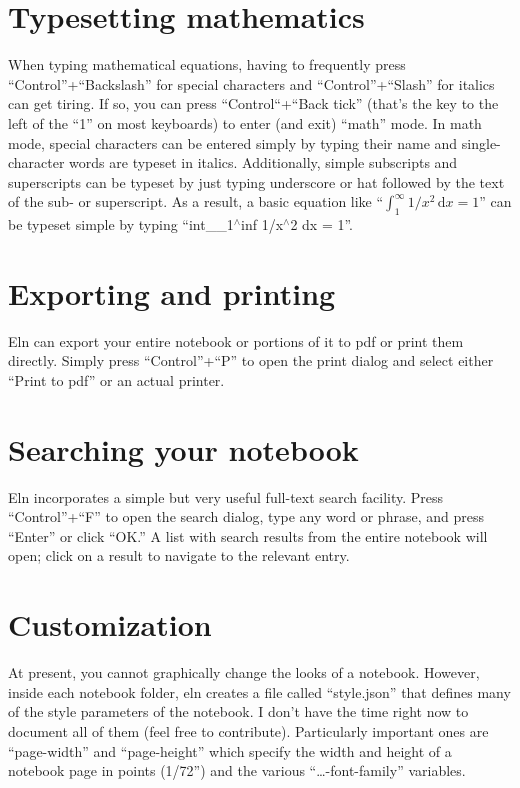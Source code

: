 \documentclass[11pt]{report}
\begin{document}
\section{Typesetting mathematics}

When typing mathematical equations, having to frequently press
``Control''+``Backslash'' for special characters and
``Control''+``Slash'' for italics can get tiring. If so, you can press
``Control``+``Back tick'' (that's the key to the left of the ``1'' on
most keyboards) to enter (and exit) ``math'' mode. In math mode,
special characters can be entered simply by typing their name and
single-character words are typeset in italics. Additionally, simple
subscripts and superscripts can be typeset by just typing underscore
or hat followed by the text of the sub- or superscript. As a result, a
basic equation like ``$\int_1^\infty 1/x^2\, \mathrm{d}x = 1$'' can be
typeset simple by typing ``int\_$\!$\_1$^\wedge$inf 1/x$^\wedge$2 dx =
1''.

\section{Exporting and printing}

Eln can export your entire notebook or portions of it to pdf or print
them directly. Simply press ``Control''+``P'' to open the print dialog
and select either ``Print to pdf'' or an actual printer.

\section{Searching your notebook}

Eln incorporates a simple but very useful full-text search
facility. Press ``Control''+``F'' to open the search dialog, type any
word or phrase, and press ``Enter'' or click ``OK.'' A list with
search results from the entire notebook will open; click on a result
to navigate to the relevant entry.

\section{Customization}

At present, you cannot graphically change the looks of a
notebook. However, inside each notebook folder, eln creates a file
called ``style.json'' that defines many of the style parameters of the
notebook. I don't have the time right now to document all of them
(feel free to contribute). Particularly important ones are
``page-width'' and ``page-height'' which specify the width and height
of a notebook page in points (1/72'') and the various
``\ldots-font-family'' variables.
\end{document}
